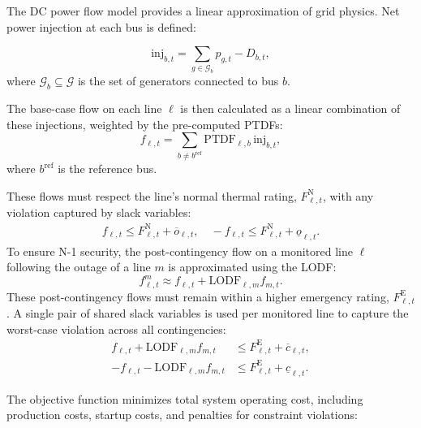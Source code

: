 \documentclass{ieeeaccess}
\begin{document}
The DC power flow model provides a linear approximation of grid physics. Net power injection at each bus is defined:

\begin{equation}
\mathrm{inj}_{b,t}=\sum_{g\in\mathcal{G}_b} p_{g,t} - D_{b,t},
\end{equation}
where $\mathcal{G}_b \subseteq \mathcal{G}$ is the set of generators connected to bus $b$.

The base-case flow on each line $\ell$ is then calculated as a linear combination of these injections, weighted by the pre-computed PTDFs:
\begin{equation}
f_{\ell,t}=\sum_{b\neq b^{\mathrm{ref}}}\mathrm{PTDF}_{\ell,b}\,\mathrm{inj}_{b,t},
\label{eq:flow-def}
\end{equation}
where $b^{\mathrm{ref}}$ is the reference bus.

These flows must respect the line's normal thermal rating, $F^{\mathrm{N}}_{\ell,t}$, with any violation captured by slack variables:
\begin{align}
f_{\ell,t} \le F^{\mathrm{N}}_{\ell,t}+\overline{o}_{\ell,t}, \quad
-f_{\ell,t} \le F^{\mathrm{N}}_{\ell,t}+\underline{o}_{\ell,t}. \label{eq:base-lims}
\end{align}
To ensure N-1 security, the post-contingency flow on a monitored line $\ell$ following the outage of a line $m$ is approximated using the LODF:
\begin{equation}
f_{\ell,t}^{m} \approx f_{\ell,t}+\mathrm{LODF}_{\ell,m}f_{m,t}. \label{eq:lodf}
\end{equation}
These post-contingency flows must remain within a higher emergency rating, $F^{\mathrm{E}}_{\ell,t}$. A single pair of shared slack variables is used per monitored line to capture the worst-case violation across all contingencies:
\begin{align}
f_{\ell,t}+\mathrm{LODF}_{\ell,m}f_{m,t} &\le F^{\mathrm{E}}_{\ell,t}+\overline{c}_{\ell,t}, \label{eq:cont-line-pos}\\
-f_{\ell,t}-\mathrm{LODF}_{\ell,m}f_{m,t} &\le F^{\mathrm{E}}_{\ell,t}+\underline{c}_{\ell,t}. \label{eq:cont-line-neg}
\end{align}


The objective function minimizes total system operating cost, including production costs, startup costs, and penalties for constraint violations:
\end{document}
